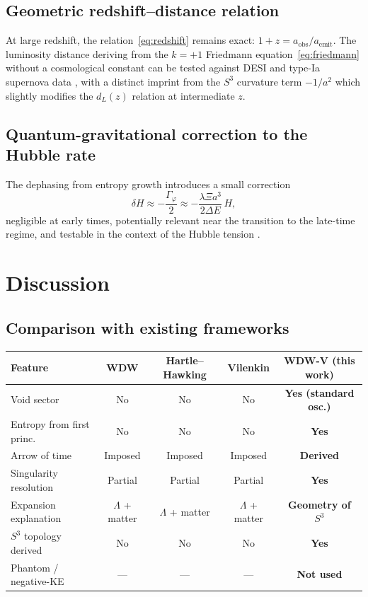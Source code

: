 \documentclass[12pt,a4paper]{article}
\theoremstyle{plain}
\theoremstyle{definition}
\begin{document}
\subsection{Geometric redshift--distance relation}

At large redshift, the relation~\eqref{eq:redshift} remains exact:
$1+z = a_{\mathrm{obs}}/a_{\mathrm{emit}}$.
The luminosity distance deriving from the $k = +1$ Friedmann
equation~\eqref{eq:friedmann} without a cosmological constant can be
tested against DESI and type-Ia supernova data \cite{DESI2024}, with a
distinct imprint from the $S^3$ curvature term $-1/a^2$ which slightly
modifies the $d_L(z)$ relation at intermediate $z$.

\subsection{Quantum-gravitational correction to the Hubble rate}

The dephasing from entropy growth introduces a small correction
\begin{equation}
  \delta H \approx -\frac{\Gamma_\varphi}{2}
  \approx -\frac{\lambda\Xi a^3}{2\Delta E}\,H,
  \label{eq:deltaH}
\end{equation}
negligible at early times, potentially relevant near the transition to
the late-time regime, and testable in the context of the Hubble tension
\cite{Riess2022,Planck2020}.

\section{Discussion}
\label{sec:discussion}

\subsection{Comparison with existing frameworks}

\begin{center}
\begin{tabular}{lcccc}
\toprule
Feature & WDW & Hartle--Hawking & Vilenkin & \textbf{WDW-V (this work)} \\
\midrule
Void sector & No & No & No & \textbf{Yes (standard osc.)} \\
Entropy from first princ.\ & No & No & No & \textbf{Yes} \\
Arrow of time & Imposed & Imposed & Imposed & \textbf{Derived} \\
Singularity resolution & Partial & Partial & Partial & \textbf{Yes} \\
Expansion explanation & $\Lambda$ + matter & $\Lambda$ + matter
  & $\Lambda$ + matter & \textbf{Geometry of $S^3$} \\
$S^3$ topology derived & No & No & No & \textbf{Yes} \\
Phantom / negative-KE & --- & --- & --- & \textbf{Not used} \\
\bottomrule
\end{tabular}
\end{center}
\end{document}
